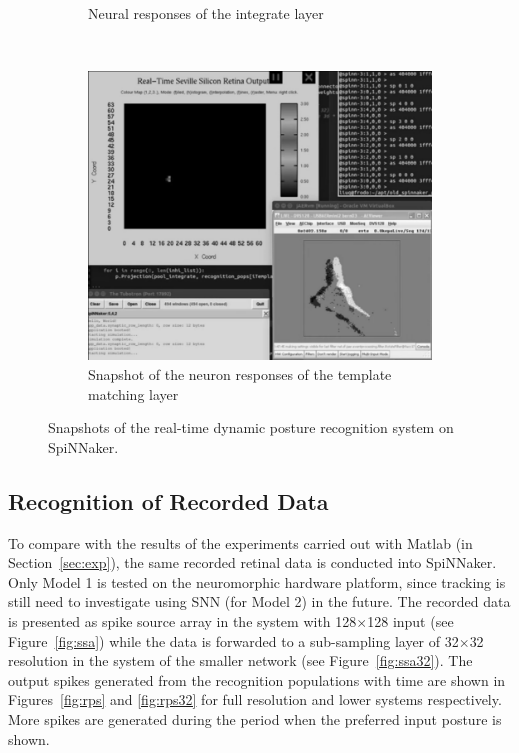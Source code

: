 \begin{figure}
\begin{subfigure}[t]{0.4\textwidth}
		\caption{Neural responses of the integrate layer~\cite{video2}}
	    \label{fig:live2}
	\end{subfigure}
	\\
	\begin{subfigure}[t]{0.8\textwidth}
		\includegraphics[width=\textwidth]{pics/live.png}
		\caption{Snapshot of the neuron responses of the template matching layer~\cite{video3}}
	    \label{fig:live3}
	\end{subfigure}	

\caption{Snapshots of the real-time dynamic posture recognition system on SpiNNaker.
}
\label{fig:live}
\end{figure}

\subsection{Recognition of Recorded Data}
To compare with the results of the experiments carried out with Matlab (in Section~\ref{sec:exp}), the same recorded retinal data is conducted into SpiNNaker.
Only Model 1 is tested on the neuromorphic hardware platform, since tracking is still need to investigate using SNN (for Model 2) in the future. 
The recorded data is presented as spike source array in the system with 128$\times$128 input (see Figure~\ref{fig:ssa}) while the data is forwarded to a sub-sampling layer of 32$\times$32 resolution in the system of the smaller network (see Figure~\ref{fig:ssa32}). 
The output spikes generated from the recognition populations with time are shown in Figures~\ref{fig:rps} and \ref{fig:rps32} for full resolution and lower systems respectively. 
More spikes are generated during the period when the preferred input posture is shown. 


